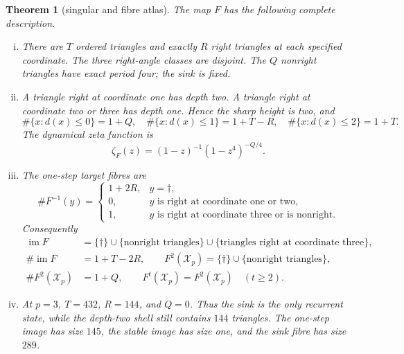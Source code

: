 \documentclass[a4paper,10pt]{amsart}
\newtheorem{theorem}{Theorem}
\theoremstyle{remark}
\newcommand{\X}{\mathcal X_p}
\newcommand{\im}{\operatorname{im}}
\newcommand{\zetaF}{\zeta_F}
\begin{document}
\begin{theorem}[singular and fibre atlas]\label{thm:atlas}
The map $F$ has the following complete description.
\begin{enumerate}[(i)]
\item There are $T$ ordered triangles and exactly $R$ right triangles at
each specified coordinate.  The three right-angle classes are disjoint.
The $Q$ nonright triangles have exact period four; the sink is fixed.

\item A triangle right at coordinate one has depth two.  A triangle right at
coordinate two or three has depth one.  Hence the sharp height is two, and
\begin{equation}\label{eq:depth-cdf}
 \#\{x:d(x)\leq0\}=1+Q,\quad
 \#\{x:d(x)\leq1\}=1+T-R,\quad
 \#\{x:d(x)\leq2\}=1+T.
\end{equation}
The dynamical zeta function is
\begin{equation}\label{eq:zeta}
 \zetaF(z)=(1-z)^{-1}(1-z^4)^{-Q/4}.
\end{equation}

\item The one-step target fibres are
\begin{equation}\label{eq:fibres}
 \#F^{-1}(y)=
 \begin{cases}
 1+2R,&y=\dagger,\\
 0,&y\text{ is right at coordinate one or two},\\
 1,&y\text{ is right at coordinate three or is nonright}.
 \end{cases}
\end{equation}
Consequently
\begin{align}
 \im F&=\{\dagger\}\cup\{\text{nonright triangles}\}
       \cup\{\text{triangles right at coordinate three}\},
       \label{eq:image-one}\\
 \#\im F&=1+T-2R,\qquad
 F^2(\X)=\{\dagger\}\cup\{\text{nonright triangles}\},
 \label{eq:stable-image}\\
 \#F^2(\X)&=1+Q,\qquad F^t(\X)=F^2(\X)\quad(t\geq2).
\end{align}

\item At $p=3$, $T=432$, $R=144$, and $Q=0$.  Thus the sink is the only
recurrent state, while the depth-two shell still contains $144$ triangles.
The one-step image has size $145$, the stable image has size one, and the
sink fibre has size $289$.
\end{enumerate}
\end{theorem}
\end{document}
